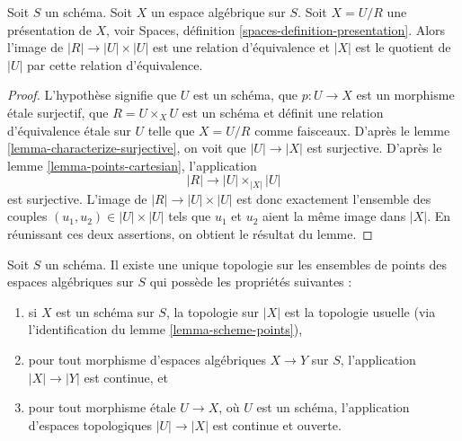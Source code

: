 \begin{lemma}
\label{lemma-points-presentation}
Soit $S$ un schéma.
Soit $X$ un espace algébrique sur $S$.
Soit $X = U/R$ une présentation de $X$, voir
Spaces, définition \ref{spaces-definition-presentation}.
Alors l'image de $|R| \to |U| \times |U|$ est une relation d'équivalence
et $|X|$ est le quotient de $|U|$ par cette relation d'équivalence.
\end{lemma}

\begin{proof}
L'hypothèse signifie que $U$ est un schéma, que $p : U \to X$ est un morphisme
étale surjectif, que $R = U \times_X U$ est un schéma et définit une relation
d'équivalence étale sur $U$ telle que $X = U/R$ comme faisceaux. D'après le
lemme \ref{lemma-characterize-surjective},
on voit que $|U| \to |X|$ est surjective. D'après le
lemme \ref{lemma-points-cartesian},
l'application
$$
|R| \longrightarrow |U| \times_{|X|} |U|
$$
est surjective. L'image de $|R| \to |U| \times |U|$ est donc
exactement l'ensemble des couples $(u_1, u_2) \in |U| \times |U|$
tels que $u_1$ et $u_2$ aient la même image dans $|X|$.
En réunissant ces deux assertions, on obtient le résultat du lemme.
\end{proof}

\begin{lemma}
\label{lemma-topology-points}
Soit $S$ un schéma. Il existe une unique topologie sur les ensembles de points
des espaces algébriques sur $S$ qui possède les propriétés suivantes :
\begin{enumerate}
\item si $X$ est un schéma sur $S$, la topologie sur $|X|$ est la topologie usuelle
(via l'identification du lemme \ref{lemma-scheme-points}),
\item pour tout morphisme d'espaces algébriques $X \to Y$ sur $S$,
l'application $|X| \to |Y|$ est continue, et
\item pour tout morphisme étale $U \to X$, où $U$ est un schéma,
l'application d'espaces topologiques $|U| \to |X|$ est continue et ouverte.
\end{enumerate}
\end{lemma}

